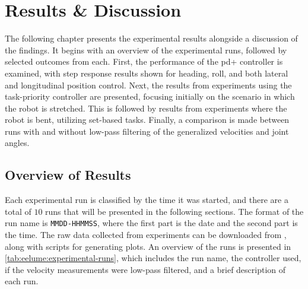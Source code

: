 \chapter{Results \& Discussion}
\label{ch:results}

The following chapter presents the experimental results alongside a discussion 
of the findings. It begins with an overview of the experimental runs, followed 
by selected outcomes from each. First, the performance of the \gls{pd+} controller 
is examined, with step response results shown for heading, roll, and both 
lateral and longitudinal position control. Next, the results from experiments using the 
task-priority controller are presented, focusing initially on the scenario in which the 
robot is stretched. This is followed by results from experiments where the 
robot is bent, utilizing set-based tasks. Finally, a comparison is 
made between runs with and without low-pass filtering of the generalized velocities
and joint angles. 


\section{Overview of Results}

Each experimental run is classified by the time it was started, and there are a total
of \(10\) runs that will be presented in the following sections. The format
of the run name is \texttt{MMDD-HHMMSS}, where the first part is the date
and the second part is the time. The raw data collected from experiments can be
downloaded from \cite{githubdata}, along with scripts for generating plots.
An overview of the runs is presented in
\autoref{tab:eelume:experimental-runs}, which includes the run name, the
controller used, if the velocity measurements were low-pass filtered, and a
brief description of each run.

